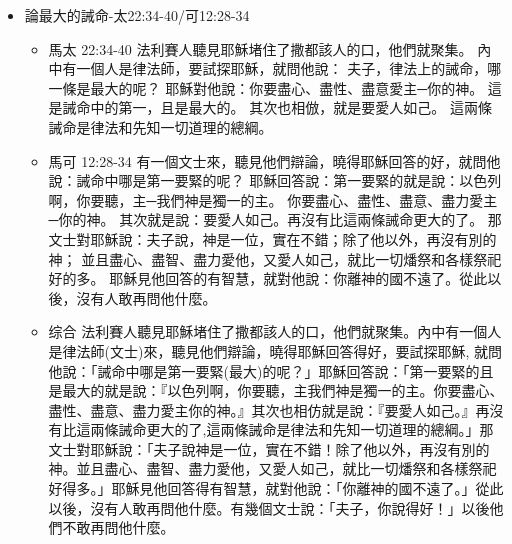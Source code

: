 \begin{itemize}
\begin{itemize}
\item{综合}
撒都該人常說沒有復活的事。有幾個來問耶穌，說：「夫子，摩西為我們寫著說：『人若死了，撇下妻子，沒有孩子，他兄弟當娶他的妻，為哥哥生子立後。』有弟兄七人，第一個娶了妻，死了，沒有留下孩子。第二個娶了她，也死了，沒有留下孩子。第三個也是這樣。那七個人都沒有留下孩子。末了，那婦人也死了。當復活的時候，她是哪一個的妻子呢？因為他們七個人都娶過她。」耶穌說：「你們所以錯了，豈不是因為不明白聖經，不曉得神的大能嗎？這世界的人有娶有嫁，唯有算為配得那世界與從死裡復活的人，也不娶也不嫁，乃像天上的使者一樣。因為他們不能再死，和天使一樣；既是復活的人，就為神的兒子。論到死人復活，你們沒有念過摩西的書『荊棘篇』上所載的嗎？神對摩西說：『我是亞伯拉罕的神、以撒的神、雅各的神』就指示明白了。神不是死人的神，乃是活人的神。因為在他那裡人都是活的。你們是大錯了！」眾人聽見這話，就稀奇他的教訓。
\end{itemize}
\item{論最大的誡命-太22:34-40/可12:28-34}
\begin{itemize}
\item{馬太 22:34-40}
法利賽人聽見耶穌堵住了撒都該人的口，他們就聚集。
內中有一個人是律法師，要試探耶穌，就問他說：
夫子，律法上的誡命，哪一條是最大的呢？
耶穌對他說：你要盡心、盡性、盡意愛主─你的神。
這是誡命中的第一，且是最大的。
其次也相倣，就是要愛人如己。
這兩條誡命是律法和先知一切道理的總綱。
\item{馬可 12:28-34}
有一個文士來，聽見他們辯論，曉得耶穌回答的好，就問他說：誡命中哪是第一要緊的呢？
耶穌回答說：第一要緊的就是說：以色列啊，你要聽，主─我們神是獨一的主。
你要盡心、盡性、盡意、盡力愛主─你的神。
其次就是說：要愛人如己。再沒有比這兩條誡命更大的了。
那文士對耶穌說：夫子說，神是一位，實在不錯；除了他以外，再沒有別的神；
並且盡心、盡智、盡力愛他，又愛人如己，就比一切燔祭和各樣祭祀好的多。
耶穌見他回答的有智慧，就對他說：你離神的國不遠了。從此以後，沒有人敢再問他什麼。
\item{综合}
法利賽人聽見耶穌堵住了撒都該人的口，他們就聚集。內中有一個人是律法師(文士)來，聽見他們辯論，曉得耶穌回答得好，要試探耶穌, 就問他說：「誡命中哪是第一要緊(最大)的呢？」耶穌回答說：「第一要緊的且是最大的就是說：『以色列啊，你要聽，主我們神是獨一的主。你要盡心、盡性、盡意、盡力愛主你的神。』其次也相仿就是說：『要愛人如己。』再沒有比這兩條誡命更大的了,這兩條誡命是律法和先知一切道理的總綱。」那文士對耶穌說：「夫子說神是一位，實在不錯！除了他以外，再沒有別的神。並且盡心、盡智、盡力愛他，又愛人如己，就比一切燔祭和各樣祭祀好得多。」耶穌見他回答得有智慧，就對他說：「你離神的國不遠了。」從此以後，沒有人敢再問他什麼。有幾個文士說：「夫子，你說得好！」以後他們不敢再問他什麼。
\end{itemize}


\end{itemize}
